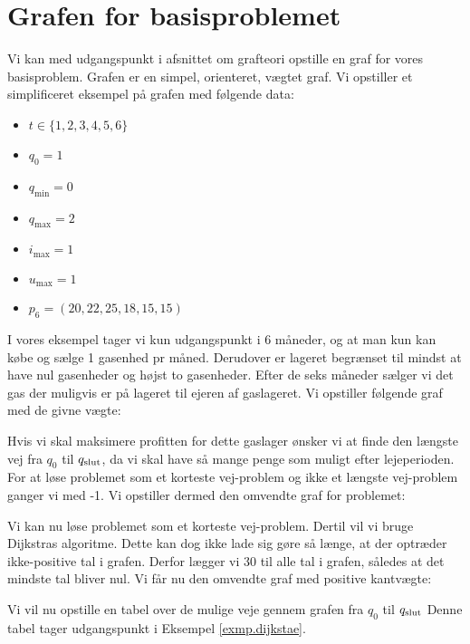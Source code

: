 \section{Grafen for basisproblemet} \label{kap:graf_basis}
Vi kan med udgangspunkt i afsnittet om grafteori opstille en graf for vores basisproblem. Grafen er en simpel, orienteret, vægtet graf. Vi opstiller et simplificeret eksempel på grafen med følgende data:
\begin{itemize}
  \item $t \in \{1,2,3,4,5,6\}$
  \item $q_{0}=1$
  \item $q_{\min}=0$
  \item $q_{\max}=2$
  \item $i_{\max}=1$
  \item $u_{\max}=1$
  \item $p_{6}=(20,22,25,18,15,15)$
\end{itemize}

I vores eksempel tager vi kun udgangspunkt i 6 måneder, og at man kun kan købe og sælge 1 gasenhed pr måned. Derudover er lageret begrænset til mindst at have nul gasenheder og højst to gasenheder. Efter de seks måneder sælger vi det gas der muligvis er på lageret til ejeren af gaslageret. Vi opstiller følgende graf med de givne vægte:



Hvis vi skal maksimere profitten for dette gaslager ønsker vi at finde den længste vej fra $q_{0}$ til $q_{\textrm{slut}}$, da vi skal have så mange penge som muligt efter lejeperioden. For at løse problemet som et korteste vej-problem og ikke et længste vej-problem ganger vi med -1. Vi opstiller dermed den omvendte graf for problemet:



Vi kan nu løse problemet som et korteste vej-problem. Dertil vil vi bruge Dijkstras algoritme. Dette kan dog ikke lade sig gøre så længe, at der optræder ikke-positive tal i grafen. Derfor lægger vi 30 til alle tal i grafen, således at det mindste tal bliver nul. Vi får nu den omvendte graf med positive kantvægte:




Vi vil nu opstille en tabel over de mulige veje gennem grafen fra $q_0$ til $q_{\textrm{slut}}$ Denne tabel tager udgangspunkt i Eksempel \ref{exmp.dijkstae}.

 


